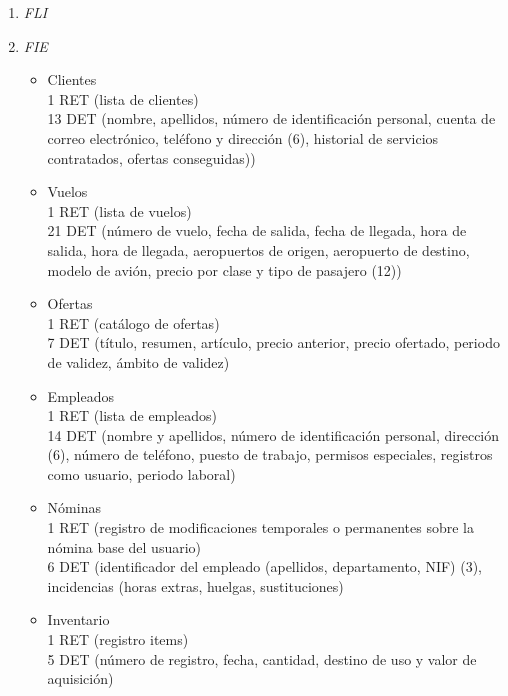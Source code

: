 		\begin{enumerate}
			\item \textit{FLI}
			\item \textit{FIE}
	
				\begin{itemize}
					\item Clientes \\
					{1 RET (lista de clientes)}\\
					{13 DET (nombre, apellidos, número de identificación personal, cuenta de correo electrónico, teléfono y dirección (6),
					historial de servicios contratados, ofertas conseguidas))}\\
					\item Vuelos \\
					{1 RET (lista de vuelos)}\\
					{21 DET (número de vuelo, fecha de salida, fecha de llegada, hora de salida, hora de llegada, aeropuertos de origen,
					aeropuerto de destino, modelo de avión, precio por clase y tipo de pasajero (12))}\\
					\item Ofertas \\
					{1 RET (catálogo de ofertas)}\\
					{7 DET (título, resumen, artículo, precio anterior, precio ofertado, periodo de validez, ámbito de validez)}\\
					\item Empleados \\
					{1 RET (lista de empleados)}\\
					{14 DET (nombre y apellidos, número de identificación personal, dirección (6), número de teléfono, puesto de trabajo,
					permisos especiales, registros como usuario, periodo laboral)}\\
					\item Nóminas \\
					{1 RET (registro de modificaciones temporales o permanentes sobre la nómina base del usuario)}\\
					{6 DET (identificador del empleado (apellidos, departamento, NIF) (3), incidencias (horas extras, huelgas, sustituciones)}\\
					\item Inventario \\
					{1 RET (registro items)}\\
					{5 DET (número de registro, fecha, cantidad, destino de uso y valor de aquisición)}\\

\end{itemize}
\end{enumerate}
